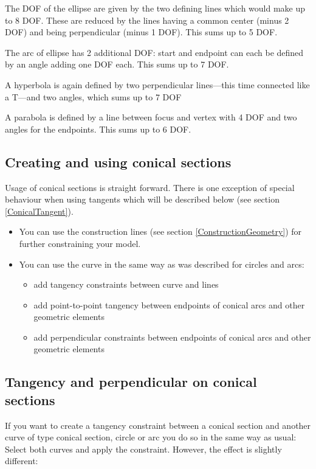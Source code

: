 \documentclass[12pt,titlepage]{article}
\begin{document}
The DOF of the ellipse are given by the two defining lines which would make up to 8 DOF. These are reduced by the lines having a common center (minus 2 DOF) and being perpendicular (minus 1 DOF). This sums up to 5 DOF.

The arc of ellipse has 2 additional DOF: start and endpoint can each be defined by an angle adding one DOF each. This sums up to 7 DOF.

A hyperbola is again defined by two perpendicular lines---this time connected like a T---and two angles, which sums up to 7 DOF

A parabola is defined by a line between focus and vertex with 4 DOF and two angles for the endpoints. This sums up to 6 DOF.

\subsection{Creating and using conical sections}
Usage of conical sections is straight forward. There is one exception of special behaviour when using tangents which will be described below (see section \vref{ConicalTangent}).
\begin{itemize}
\item You can use the construction lines (see section \vref{ConstructionGeometry}) for further       constraining your model.
\item You can use the curve in the same way as was described for circles and arcs:
      \begin{itemize}
      \item add tangency constraints between curve and lines
      \item add point-to-point tangency between endpoints of conical arcs and             other geometric elements
      \item add perpendicular constraints between endpoints of conical arcs             and other geometric elements
      \end{itemize}
\end{itemize}

\subsection{Tangency and perpendicular on conical sections}
\label{ConicalTangent}
If you want to create a tangency constraint between a conical section and another curve of type conical section, circle or arc you do so in the same way as usual: Select both curves and apply the constraint. However, the effect is slightly different:
\end{document}
